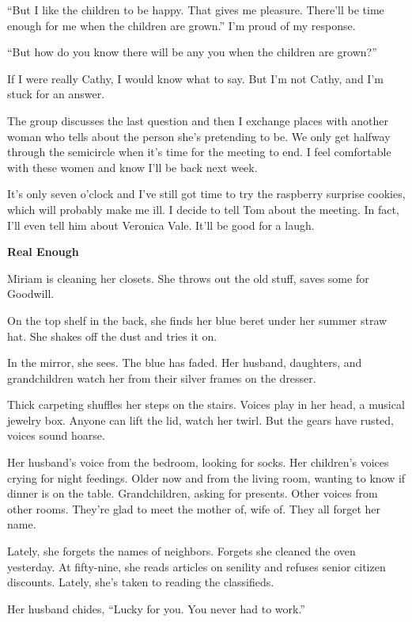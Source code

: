 \documentclass[
]{article}
\begin{document}
``But I like the children to be happy. That gives me pleasure. There'll
be time enough for me when the children are grown.'' I'm proud of my
response.

``But how do you know there will be any you when the children are
grown?''

If I were really Cathy, I would know what to say. But I'm not Cathy, and
I'm stuck for an answer.

The group discusses the last question and then I exchange places with
another woman who tells about the person she's pretending to be. We only
get halfway through the semicircle when it's time for the meeting to
end. I feel comfortable with these women and know I'll be back next
week.

It's only seven o'clock and I've still got time to try the raspberry
surprise cookies, which will probably make me ill. I decide to tell Tom
about the meeting. In fact, I'll even tell him about Veronica Vale.
It'll be good for a laugh.

\textbf{\hfill\break
}

\textbf{Real Enough}

Miriam is cleaning her closets. She throws out the old stuff, saves some
for Goodwill.

On the top shelf in the back, she finds her blue beret under her summer
straw hat. She shakes off the dust and tries it on.

In the mirror, she sees. The blue has faded. Her husband, daughters, and
grandchildren watch her from their silver frames on the dresser.

Thick carpeting shuffles her steps on the stairs. Voices play in her
head, a musical jewelry box. Anyone can lift the lid, watch her twirl.
But the gears have rusted, voices sound hoarse.

Her husband's voice from the bedroom, looking for socks. Her children's
voices crying for night feedings. Older now and from the living room,
wanting to know if dinner is on the table. Grand­children, asking for
presents. Other voices from other rooms. They're glad to meet the mother
of, wife of. They all forget her name.

Lately, she forgets the names of neighbors. Forgets she cleaned the oven
yesterday. At fifty-nine, she reads articles on senility and refuses
senior citizen discounts. Lately, she's taken to reading the
classifieds.

Her husband chides, ``Lucky for you. You never had to work.''
\end{document}
